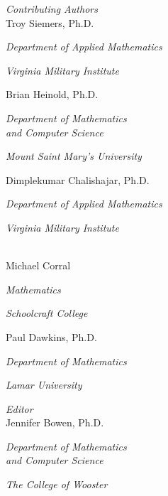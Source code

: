 
\noindent\hspace{-1in}\begin{minipage}[t]{2.5in}\raggedright

\textit{Contributing Authors}\\

Troy Siemers, Ph.D.

\emph{\small Department of Applied Mathematics}

\emph{\small Virginia Military Institute}\bigskip

Brian Heinold, Ph.D.

\emph{\small Department of Mathematics\\and Computer Science}

\emph{\small Mount Saint Mary's University}\bigskip

Dimplekumar Chalishajar, Ph.D.

\emph{\small Department of Applied Mathematics}

\emph{\small Virginia Military Institute}
\end{minipage}%
\begin{minipage}[t]{2.5in}\raggedright
\mbox{}\\

Michael Corral

\emph{\small Mathematics}

\emph{\small Schoolcraft College}\bigskip

Paul Dawkins, Ph.D.

\emph{\small Department of Mathematics}

\emph{\small Lamar University}

\end{minipage}

\bigskip\medskip

\noindent\hspace{-1in}\begin{minipage}[t]{2.5in}\raggedright
\textit{Editor}\\

Jennifer Bowen, Ph.D.

\emph{\small Department of Mathematics\\and Computer Science}

\emph{\small The College of Wooster}
\end{minipage}%
\begin{minipage}[t]{2.5in}
%
%
%
\end{minipage}

